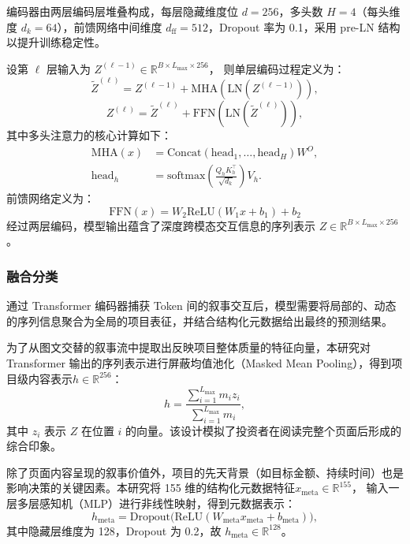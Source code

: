 编码器由两层编码层堆叠构成，每层隐藏维度位 $ d=256 $，多头数 $ H=4 $（每头维度 $ d_k=64 $），前馈网络中间维度 $ d_{\text{ff}}=512 $，Dropout 率为 0.1，采用 pre-LN 结构以提升训练稳定性。

设第 $ \ell $ 层输入为 $ Z^{(\ell-1)}\in\mathbb{R}^{B\times L_{\max}\times 256} $， 则单层编码过程定义为：
\begin{equation}
\tilde{Z}^{(\ell)}=Z^{(\ell-1)}+\text{MHA}(\text{LN}(Z^{(\ell-1)})),
\end{equation}
\begin{equation}
Z^{(\ell)}=\tilde{Z}^{(\ell)}+\text{FFN}(\text{LN}(\tilde{Z}^{(\ell)})),
\end{equation}
其中多头注意力的核心计算如下：
\begin{equation}
\begin{aligned}
\text{MHA}(x)&=\text{Concat}(\text{head}_1,\ldots,\text{head}_H)W^O,\\
\text{head}_h&=\text{softmax}\left(\frac{Q_hK_h^\top}{\sqrt{d_k}}\right)V_h.
\end{aligned}
\end{equation}
前馈网络定义为：
\begin{equation}
\text{FFN}(x) = W_2\text{ReLU}(W_1x + b_1) + b_2
\end{equation}
经过两层编码，模型输出蕴含了深度跨模态交互信息的序列表示 $ Z\in\mathbb{R}^{B\times L_{\max}\times 256} $。

\subsubsection{融合分类}
通过 Transformer 编码器捕获 Token 间的叙事交互后，模型需要将局部的、动态的序列信息聚合为全局的项目表征，并结合结构化元数据给出最终的预测结果。

为了从图文交替的叙事流中提取出反映项目整体质量的特征向量，本研究对 Transformer 输出的序列表示进行屏蔽均值池化（Masked Mean Pooling），得到项目级内容表示$ h\in\mathbb{R}^{256} $：
\begin{equation}
h=\frac{\sum_{i=1}^{L_{\max}} m_i z_i}{\sum_{i=1}^{L_{\max}} m_i},
\end{equation}
其中 $ z_i $ 表示 $ Z $ 在位置 $ i $ 的向量。该设计模拟了投资者在阅读完整个页面后形成的综合印象。

除了页面内容呈现的叙事价值外，项目的先天背景（如目标金额、持续时间）也是影响决策的关键因素。本研究将 155 维的结构化元数据特征$ x_{\text{meta}}\in\mathbb{R}^{155} $， 输入一层多层感知机（MLP）进行非线性映射，得到元数据表示：
\begin{equation}
h_{\text{meta}}=\text{Dropout}\big(\text{ReLU}(W_{\text{meta}}x_{\text{meta}}+b_{\text{meta}})\big),
\end{equation}
其中隐藏层维度为 128，Dropout 为 0.2，故 $ h_{\text{meta}}\in\mathbb{R}^{128} $。

